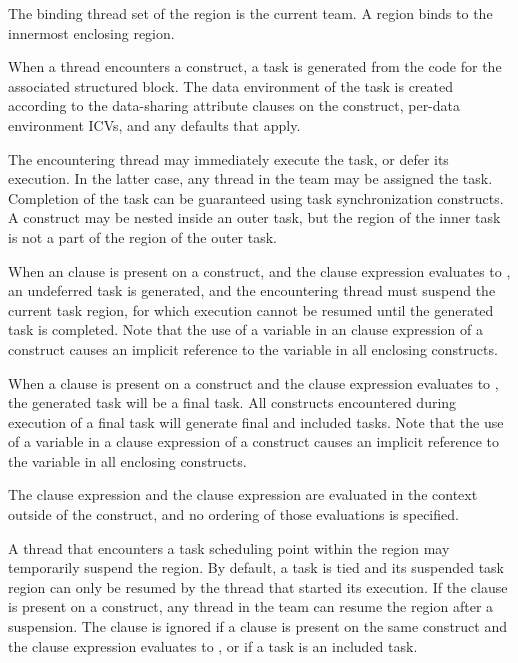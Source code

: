 \binding
The binding thread set of the  region is the current team. A  region binds to 
the innermost enclosing  region. 

\descr
When a thread encounters a  construct, a task is generated from the code for the 
associated structured block. The data environment of the task is created according to the 
data-sharing attribute clauses on the  construct, per-data environment ICVs, and 
any defaults that apply.

The encountering thread may immediately execute the task, or defer its execution. In the 
latter case, any thread in the team may be assigned the task. Completion of the task can 
be guaranteed using task synchronization constructs. A  construct may be nested 
inside an outer task, but the  region of the inner task is not a part of the  
region of the outer task.

When an  clause is present on a  construct, and the  clause expression 
evaluates to , an undeferred task is generated, and the encountering thread must 
suspend the current task region, for which execution cannot be resumed until the 
generated task is completed. Note that the use of a variable in an  clause expression 
of a  construct causes an implicit reference to the variable in all enclosing 
constructs.

When a  clause is present on a  construct and the  clause expression 
evaluates to , the generated task will be a final task. All  constructs 
encountered during execution of a final task will generate final and included tasks. Note 
that the use of a variable in a  clause expression of a  construct causes an 
implicit reference to the variable in all enclosing constructs.

The  clause expression and the  clause expression are evaluated in the context 
outside of the  construct, and no ordering of those evaluations is specified.

A thread that encounters a task scheduling point within the  region may 
temporarily suspend the  region. By default, a task is tied and its suspended task 
region can only be resumed by the thread that started its execution. If the  
clause is present on a  construct, any thread in the team can resume the  
region after a suspension. The  clause is ignored if a  clause is present 
on the same  construct and the  clause expression evaluates to , or if a 
task is an included task.

